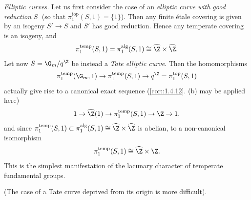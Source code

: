 \begin{para}\label{para::2.3.2} {\it Elliptic curves.} Let us first consider
 the case of an {\it elliptic curve with good reduction} $S\;$ (so that
 $\pi_1^{\mathrm{top}}(S,1)=\{1\}$).  Then any finite
 \'etale covering is given by an isogeny
 $S'\to S$ and $S'$ has good reduction. Hence any temperate covering is
 an isogeny, and 
 \begin{equation*}
  \pi_1^{\mathrm{temp}}(S,1)=\pi_1^{\mathrm{alg}}(S,1)\cong \widehat{\Z}\times
   \widehat{\Z}.
 \end{equation*} 
 Let now $S=\G_m/q^\Z$ be instead a {\it Tate elliptic curve}. Then the
 homomorphisms 
 \begin{equation*}
  \pi_1^{\mathrm{temp}}(\G_m,1)\to \pi_1^{\mathrm{temp}}(S,1)\to q^\Z
 =\pi_1^{\mathrm{top}}(S,1)  
 \end{equation*}
 actually give rise to a canonical exact sequence
 (\ref{cor::1.4.12}. (b) may be applied here)
 \begin{equation*}
  1\to \widehat{\Z}(1)\to  \pi_1^{\mathrm{temp}}(S,1)\to  \Z \to 1,
\end{equation*}
 and since $ \pi_1^{\mathrm{temp}}(S,1)\subset
 \pi_1^{\mathrm{alg}}(S,1)\cong \widehat{\Z}\times \widehat{\Z}$ is
 abelian, to a non-canonical isomorphism 
 \begin{equation*}
  \pi_1^{\mathrm{temp}}(S,1)\cong \widehat{\Z}\times \Z.
 \end{equation*} 
 This is the simplest manifestation of the lacunary character of
 temperate fundamental groups.

 \medskip\noindent (The case of a Tate curve deprived from its origin is
 more difficult).
\end{para}

